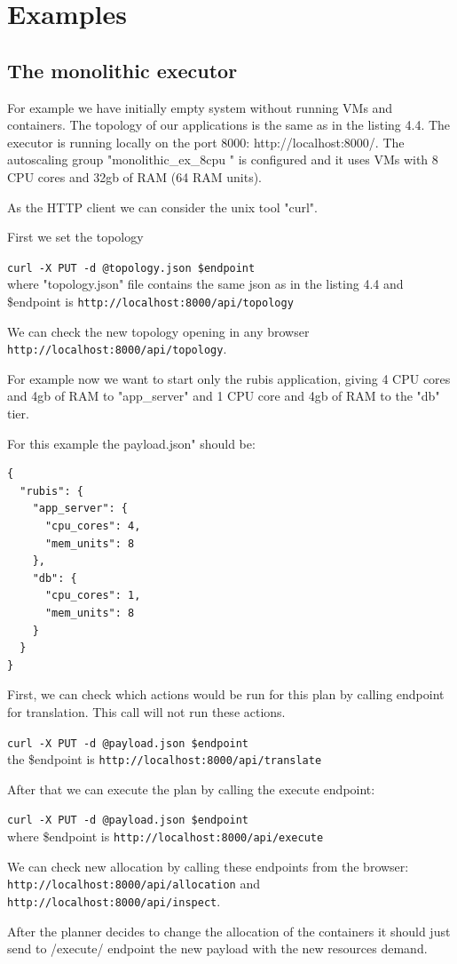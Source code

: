 \clearpage
\section{Examples}
\subsection{The monolithic executor}
For example we have initially empty system without running VMs and containers. The topology of our applications is the same as in the listing 4.4. The executor is running locally on the port 8000: http://localhost:8000/. The autoscaling group "monolithic\_ex\_8cpu " is configured and it uses VMs with 8 CPU cores and 32gb of RAM (64 RAM units).

As the HTTP client we can consider the unix tool "curl". 

First we set the topology

\texttt{curl -X PUT -d @topology.json \$endpoint}\\
where "topology.json" file contains the same json as in the listing 4.4 and \$endpoint is
\texttt{http://localhost:8000/api/topology}

We can check the new topology opening in any browser \\ \texttt{http://localhost:8000/api/topology}.

For example now we want to start only the rubis application, giving 4 CPU cores and 4gb of RAM to "app\_server" and 1 CPU core and 4gb of RAM to the "db" tier.

For this example the payload.json" should be:

\begin{lstlisting}[caption=payload.json,basicstyle=\tiny]
{
  "rubis": {
    "app_server": {
      "cpu_cores": 4,
      "mem_units": 8
    },
    "db": {
      "cpu_cores": 1,
      "mem_units": 8
    }
  }
}
\end{lstlisting}

First, we can check which actions would be run for this plan by calling endpoint for translation. This call will not run these actions.

\texttt{curl -X PUT -d @payload.json \$endpoint}\\
the \$endpoint is \texttt{http://localhost:8000/api/translate}

After that we can execute the plan by calling the execute endpoint:

\texttt{curl -X PUT -d @payload.json \$endpoint}\\
where \$endpoint is \texttt{http://localhost:8000/api/execute}

We can check new allocation by calling these endpoints from the browser: \texttt{http://localhost:8000/api/allocation} and \\ \texttt{http://localhost:8000/api/inspect}.

After the planner decides to change the allocation of the containers it should just send to /execute/ endpoint the new payload with the new resources demand.